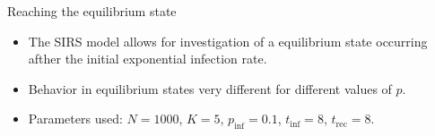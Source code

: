 \documentclass[blackandwhite]{beamer}
\begin{document}
\begin{frame}{Reaching the equilibrium state}
	\begin{itemize}
	\item
	The SIRS model allows for investigation of a equilibrium state occurring afther the initial exponential infection rate.
	\item
	Behavior in equilibrium states very different for different values of $p$.
	\item
	Parameters used: $N = 1000$, $K = 5$, $p_{\text{inf}} = 0.1$, $t_{\text{inf}} = 8$, $t_{\text{rec}} = 8$.
	\end{itemize}
	\begin{figure}
\end{figure}
\end{frame}
\end{document}
